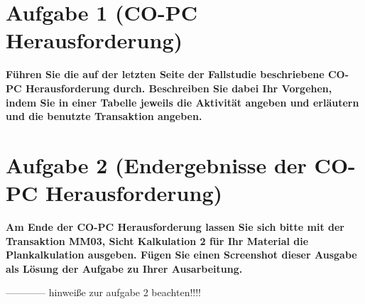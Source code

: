 \section{Aufgabe 1 (CO-PC Herausforderung)}
\textbf{Führen Sie die auf der letzten Seite der Fallstudie beschriebene CO-PC Herausforderung
durch. Beschreiben Sie dabei Ihr Vorgehen, indem Sie in einer Tabelle jeweils die Aktivität
angeben und erläutern und die benutzte Transaktion angeben.}

\clearpage

\section{Aufgabe 2 (Endergebnisse der CO-PC Herausforderung)}
\textbf{Am Ende der CO-PC Herausforderung lassen Sie sich bitte mit der Transaktion MM03, Sicht
Kalkulation 2 für Ihr Material die Plankalkulation ausgeben. Fügen Sie einen Screenshot dieser
Ausgabe als Lösung der Aufgabe zu Ihrer Ausarbeitung.}

------------ hinweiße zur aufgabe 2 beachten!!!!

\clearpage 